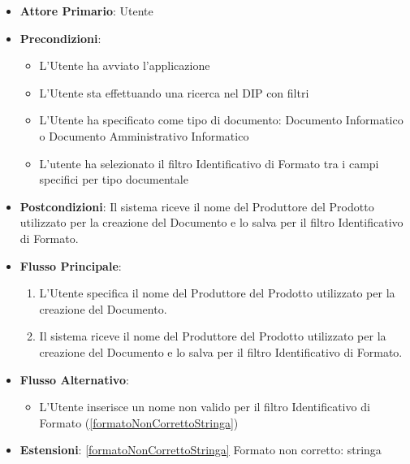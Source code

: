\begin{itemize}
      \item \textbf{Attore Primario}: Utente
      \item \textbf{Precondizioni}: 
      \begin{itemize}
            \item L'Utente ha avviato l'applicazione
            \item L'Utente sta effettuando una ricerca nel DIP con filtri
            \item L'Utente ha specificato come tipo di documento: Documento Informatico o Documento Amministrativo Informatico
            \item L'utente ha selezionato il filtro Identificativo di Formato tra i campi specifici per tipo documentale
      \end{itemize}
      \item \textbf{Postcondizioni}: Il sistema riceve il nome del Produttore del Prodotto utilizzato per la creazione del Documento e lo salva per il filtro Identificativo di Formato.
      \item \textbf{Flusso Principale}:
      \begin{enumerate}
            \item L'Utente specifica il nome del Produttore del Prodotto utilizzato per la creazione del Documento.
            \item Il sistema riceve il nome del Produttore del Prodotto utilizzato per la creazione del Documento e lo salva per il filtro Identificativo di Formato.
      \end{enumerate}
      \item \textbf{Flusso Alternativo}:
      \begin{itemize}
            \item L'Utente inserisce un nome non valido per il filtro Identificativo di Formato (\ref{formatoNonCorrettoStringa})
      \end{itemize}
      \item \textbf{Estensioni}: \ref{formatoNonCorrettoStringa} Formato non corretto: stringa
\end{itemize}

